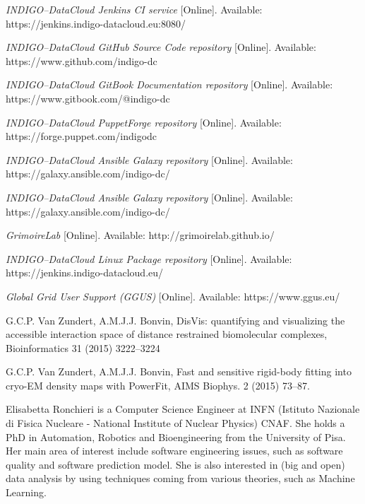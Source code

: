 \documentclass[journal]{IEEEtran}
\begin{document}
\begin{thebibliography}{1}
\emph{INDIGO--DataCloud Jenkins CI service} [Online]. Available:
https://jenkins.indigo-datacloud.eu:8080/

\emph{INDIGO--DataCloud GitHub Source Code repository} [Online]. Available:
https://www.github.com/indigo-dc

\emph{INDIGO--DataCloud GitBook Documentation repository} [Online]. Available:
https://www.gitbook.com/@indigo-dc

\emph{INDIGO--DataCloud PuppetForge repository} [Online]. Available:
https://forge.puppet.com/indigodc

\emph{INDIGO--DataCloud Ansible Galaxy repository} [Online]. Available:
https://galaxy.ansible.com/indigo-dc/

\emph{INDIGO--DataCloud Ansible Galaxy repository} [Online]. Available:
https://galaxy.ansible.com/indigo-dc/

\emph{GrimoireLab} [Online]. Available: http://grimoirelab.github.io/

\emph{INDIGO--DataCloud Linux Package repository} [Online]. Available: https://jenkins.indigo-datacloud.eu/

\emph{Global Grid User Support (GGUS)} [Online]. Available: https://www.ggus.eu/

 G.C.P. Van Zundert, A.M.J.J. Bonvin,
DisVis: quantifying and visualizing the accessible interaction space of distance
restrained biomolecular complexes, Bioinformatics 31 (2015) 3222–3224

 G.C.P. Van Zundert, A.M.J.J. Bonvin,
Fast and sensitive rigid-body fitting into cryo-EM density maps with PowerFit,
AIMS Biophys. 2 (2015) 73–87.

\end{thebibliography}

\begin{IEEEbiography} {Elisabetta Ronchieri}
is a Computer Science Engineer at INFN (Istituto Nazionale di Fisica Nucleare - National Institute of Nuclear Physics) CNAF. She holds a PhD in Automation, Robotics and Bioengineering from the University of Pisa. Her main area of interest include software engineering issues, such as software quality and software prediction model. She is also interested in (big and open) data analysis by using techniques coming from various theories, such as Machine Learning.
\end{IEEEbiography}
\end{document}
